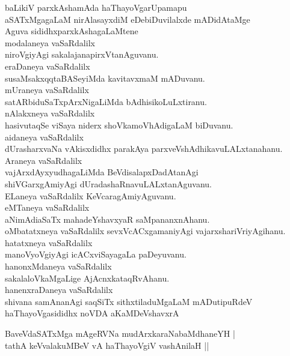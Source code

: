\begin{entry}
\begin{shl}
baLikiV parxkAshamAda haThayoVgarUpamapu\\
aSATxMgagaLaM nirAlasayxdiM eDebiDuvilalxde mADidAtaMge\\
Aguva sididhxparxkAshagaLaMtene\\
modalaneya vaSaRdalilx\\
niroVgiyAgi sakalajanapirxVtanAguvanu.\\
eraDaneya vaSaRdalilx\\
susaMsakxqqtaBASeyiMda kavitavxmaM mADuvanu.\\
mUraneya vaSaRdalilx\\
satARbiduSaTxpArxNigaLiMda bAdhisikoLuLxtiranu.\\
nAlakxneya vaSaRdalilx\\
hasivutaqSe viSaya niderx shoVkamoVhAdigaLaM biDuvanu.\\
aidaneya vaSaRdalilx\\
dUrasharxvaNa vAkisxdidhx parakAya parxveVshAdhikavuLALxtanahanu.\\
Araneya vaSaRdalilx\\
vajArxdAyxyudhagaLiMda BeVdisalapxDadAtanAgi\\
shiVGarxgAmiyAgi dUradashaRnavuLALxtanAguvanu.\\
ELaneya vaSaRdalilx KeVcaragAmiyAguvanu.\\
eMTaneya vaSaRdalilx\\
aNimAdiaSaTx mahadeYshavxyaR saMpananxnAhanu.\\
oMbatatxneya vaSaRdalilx sevxVcACxgamaniyAgi vajarxshariVriyAgihanu.\\
hatatxneya vaSaRdalilx\\
manoVyoVgiyAgi icACxviSayagaLa paDeyuvanu.\\
hanonxMdaneya vaSaRdalilx\\
sakalaloVkaMgaLige AjAcnxkataqRvAhanu.\\
hanenxraDaneya vaSaRdalilx\\
shivana samAnanAgi saqSiTx sithxtiladuMgaLaM mADutipuRdeV\\
haThayoVgasididhx noVDA aKaMDeVshavxrA
\end{shl}
\end{entry}

\begin{entry}
\begin{shl}
BaveVdaSATxMga mAgeRVNa mudArxkaraNabaMdhaneYH |\\
tathA keVvalakuMBeV vA haThayoVgiV vashAnilaH || 
\end{shl}
\end{entry}

